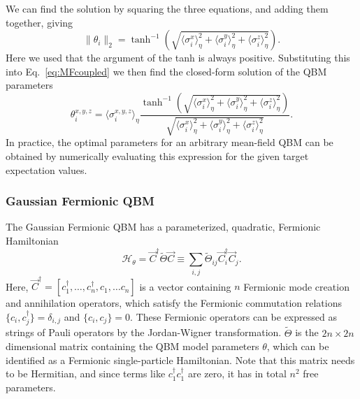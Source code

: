 \documentclass[
    reprint,
    aps,
    prx,
    longbibliography
]{revtex4-2}
\begin{document}
We can find the solution by squaring the three equations, and adding them together, giving
\begin{equation}
    \| \theta_i \|_2 = \tanh^{-1} \left(  \sqrt{\langle \sigma_i^{x}\rangle_\eta^2 + \langle \sigma_i^{y}\rangle_\eta^2 + \langle \sigma_i^{z}\rangle_\eta^2  } \right).
\end{equation}
Here we used that the argument of the tanh is always positive. Substituting this into Eq.~\eqref{eq:MFcoupled} we then find the closed-form solution of the QBM parameters
\begin{equation}
\theta_i^{x,y,z} = \langle \sigma_i^{x,y,z}\rangle_\eta \frac{ \tanh^{-1} \left( \sqrt{\langle \sigma_i^{x}\rangle_\eta^2 + \langle \sigma_i^{y}\rangle_\eta^2 + \langle \sigma_i^{z}\rangle_\eta^2  } \right) }{ \sqrt{\langle \sigma_i^{x}\rangle_\eta^2 + \langle \sigma_i^{y}\rangle_\eta^2 + \langle \sigma_i^{z}\rangle_\eta^2  } }.
\end{equation} 
In practice, the optimal parameters for an arbitrary mean-field QBM can be obtained by numerically evaluating this expression for the given target expectation values. 

\subsubsection*{Gaussian Fermionic QBM}

The Gaussian Fermionic QBM has a parameterized, quadratic, Fermionic Hamiltonian
\begin{equation}
    \mathcal{H}_\theta = \vec{C}^\dagger \tilde{\Theta} \vec{C} \equiv \sum_{i,j}\tilde{\Theta}_{ij} \vec{C}^\dagger_i \vec{C}_j.
\end{equation}
Here, $\vec{C}^\dagger = [c_1^\dagger, \dots, c_n^\dagger, c_1, \dots c_n ]$ is a vector containing $n$ Fermionic mode creation and annihilation operators, which satisfy the Fermionic commutation relations $\{c_i, c_j^\dagger\}=\delta_{i,j}$ and $\{c_i, c_j\}=0$. These Fermionic operators can be expressed as strings of Pauli operators by the Jordan-Wigner transformation. $\tilde{\Theta}$ is the  $2n\times 2n$ dimensional matrix containing the QBM model parameters $\theta$, which can be identified as a Fermionic single-particle Hamiltonian. Note that this matrix needs to be Hermitian, and since terms like $c^\dagger_1 c^\dagger_1$ are zero, it has in total $n^2$ free parameters. 
\end{document}
